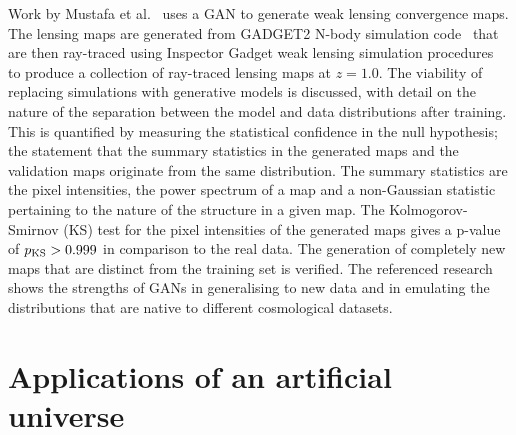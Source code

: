 \documentclass[twocolumn]{article}
\numberwithin{equation}{section}
\begin{document}
Work by Mustafa et al.~\cite{cosmogan} uses a GAN to generate weak lensing convergence maps. The lensing maps are 
generated from GADGET2 N-body simulation code~\cite{gadget2} that are then ray-traced using Inspector Gadget weak 
lensing simulation procedures~\cite{mink_funcs, lens_peaks, lens_peak_counts} to produce a collection of ray-traced 
lensing maps at $z=1.0$. The viability of replacing simulations with generative models is discussed, with detail on 
the nature of the separation between the model and data distributions after training. This is quantified by measuring 
the statistical confidence in the null hypothesis; the statement that the summary statistics in the generated maps and 
the validation maps originate from the same distribution. The summary statistics are the pixel intensities, the power 
spectrum of a map and a non-Gaussian statistic pertaining to the nature of the structure in a given map. The 
Kolmogorov-Smirnov (KS) test for the pixel intensities of the generated maps gives a p-value of $p_{\textup{KS}} > 
0.999$ in comparison to the real data. The generation of completely new maps that are distinct from the training set
is verified. The referenced research shows the strengths of GANs in generalising to new data and in emulating the 
distributions that are native to different cosmological datasets.



\section{Applications of an artificial universe}\label{sec:universe_applications}

\end{document}
